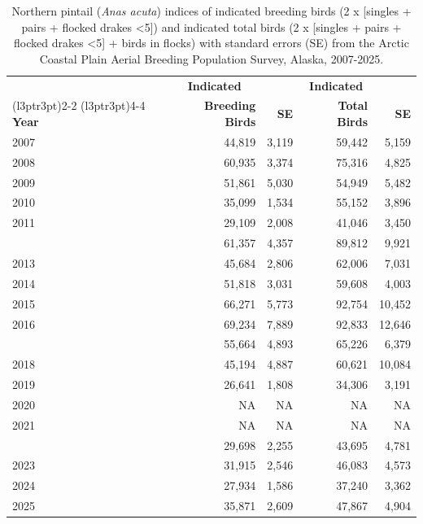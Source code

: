 \documentclass[
]{article}
\begin{document}
\begin{longtable}[t]{lrrrr}

\caption{\label{tbl-NOPI}Northern pintail (\emph{Anas acuta}) indices of
indicated breeding birds (2 x {[}singles + pairs + flocked drakes
\textless5{]}) and indicated total birds (2 x {[}singles + pairs +
flocked drakes \textless5{]} + birds in flocks) with standard errors
(SE) from the Arctic Coastal Plain Aerial Breeding Population Survey,
Alaska, 2007-2025.}

\tabularnewline

\\
\toprule
\multicolumn{1}{c}{\textbf{ }} & \multicolumn{1}{c}{\textbf{Indicated}} & \multicolumn{1}{c}{\textbf{ }} & \multicolumn{1}{c}{\textbf{Indicated}} & \multicolumn{1}{c}{\textbf{ }} \\
\cmidrule(l{3pt}r{3pt}){2-2} \cmidrule(l{3pt}r{3pt}){4-4}
\textbf{Year} & \textbf{Breeding Birds} & \textbf{SE} & \textbf{Total Birds} & \textbf{SE}\\
\midrule
2007 & 44,819 & 3,119 & 59,442 & 5,159\\
2008 & 60,935 & 3,374 & 75,316 & 4,825\\
2009 & 51,861 & 5,030 & 54,949 & 5,482\\
2010 & 35,099 & 1,534 & 55,152 & 3,896\\
2011 & 29,109 & 2,008 & 41,046 & 3,450\\
\addlinespace
2012 & 61,357 & 4,357 & 89,812 & 9,921\\
2013 & 45,684 & 2,806 & 62,006 & 7,031\\
2014 & 51,818 & 3,031 & 59,608 & 4,003\\
2015 & 66,271 & 5,773 & 92,754 & 10,452\\
2016 & 69,234 & 7,889 & 92,833 & 12,646\\
\addlinespace
2017 & 55,664 & 4,893 & 65,226 & 6,379\\
2018 & 45,194 & 4,887 & 60,621 & 10,084\\
2019 & 26,641 & 1,808 & 34,306 & 3,191\\
2020 & NA & NA & NA & NA\\
2021 & NA & NA & NA & NA\\
\addlinespace
2022 & 29,698 & 2,255 & 43,695 & 4,781\\
2023 & 31,915 & 2,546 & 46,083 & 4,573\\
2024 & 27,934 & 1,586 & 37,240 & 3,362\\
2025 & 35,871 & 2,609 & 47,867 & 4,904\\
\bottomrule

\end{longtable}
\end{document}

